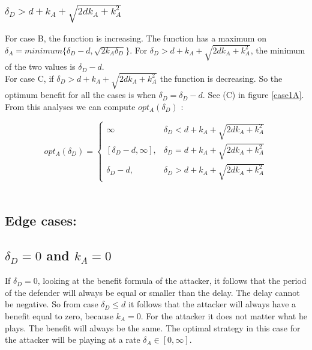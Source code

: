 \subsubsection*{$\delta_{D} > d+k_{A} + \sqrt{2dk_{A}+k_{A}^{2}}$} 
For case B, the function is increasing. The function has a maximum on $\delta_{A} = minimum \{\delta_{D} -d, \sqrt{2k_{A}\delta_{D}} \} $. For $\delta_{D} > d+k_{A} + \sqrt{2dk_{A}+k_{A}^{2}}$, the minimum of the two values is $\delta_{D}-d$.\\
For case C, if $\delta_{D} > d+k_{A} + \sqrt{2dk_{A}+k_{A}^{2}}$ the function is decreasing. So the optimum benefit for all the cases is when $\delta_{D} = \delta_{D}-d$. See (C) in figure \ref{case1A}.\\


From this analyses we can compute $opt_{A}(\delta_{D})$ : 

 \begin{displaymath}
  opt_{A}(\delta_{D}) = \left\{
     \begin{array}{lr}
            \infty & \delta_{D} < d+k_{A} + \sqrt{2dk_{A}+k_{A}^{2}} \\
       \left[ \delta_{D}-d, \infty\right],  & \delta_{D} = d+k_{A} + \sqrt{2dk_{A}+k_{A}^{2}} \\
    	\delta_{D}-d, & \delta_{D} > d+k_{A} + \sqrt{2dk_{A}+k_{A}^{2}}
     \end{array}
   \right.
\end{displaymath}
\\

\subsection*{Edge cases:}

\subsection*{$\delta_{D}=0$ and $k_{A}=0$}
If $\delta_{D}=0$, looking at the benefit formula of the attacker, it follows that the period of the defender will always be equal or smaller than the delay. The delay cannot be negative. So from case $\delta_{D} \leq d$ it follows that the attacker will always have a benefit equal to zero, because $k_{A}=0$. For the attacker it does not matter what he plays. The benefit will always be the same. The optimal strategy in this case for the attacker will be playing at a rate $\delta_{A} \in [0,\infty ]$.

